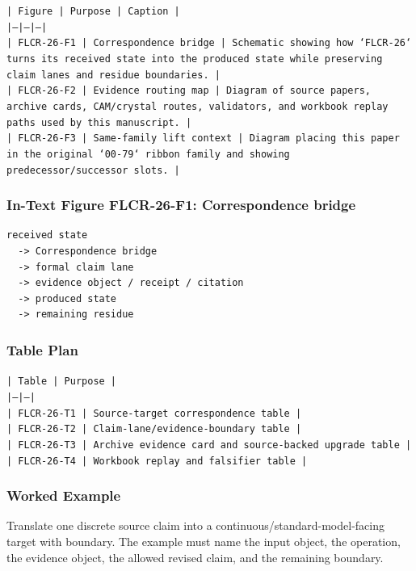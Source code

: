 \documentclass[11pt]{article}
\begin{document}
\noindent\texttt{| Figure | Purpose | Caption |}\\
\noindent\texttt{|---|---|---|}\\
\noindent\texttt{| FLCR-26-F1 | Correspondence bridge | Schematic showing how `FLCR-26` turns its received state into the produced state while preserving claim lanes and residue boundaries. |}\\
\noindent\texttt{| FLCR-26-F2 | Evidence routing map | Diagram of source papers, archive cards, CAM/crystal routes, validators, and workbook replay paths used by this manuscript. |}\\
\noindent\texttt{| FLCR-26-F3 | Same-family lift context | Diagram placing this paper in the original `00-79` ribbon family and showing predecessor/successor slots. |}\\

\subsubsection*{In-Text Figure FLCR-26-F1: Correspondence bridge}

\begin{verbatim}
received state
  -> Correspondence bridge
  -> formal claim lane
  -> evidence object / receipt / citation
  -> produced state
  -> remaining residue
\end{verbatim}

\subsubsection*{Table Plan}

\noindent\texttt{| Table | Purpose |}\\
\noindent\texttt{|---|---|}\\
\noindent\texttt{| FLCR-26-T1 | Source-target correspondence table |}\\
\noindent\texttt{| FLCR-26-T2 | Claim-lane/evidence-boundary table |}\\
\noindent\texttt{| FLCR-26-T3 | Archive evidence card and source-backed upgrade table |}\\
\noindent\texttt{| FLCR-26-T4 | Workbook replay and falsifier table |}\\

\subsubsection*{Worked Example}

Translate one discrete source claim into a continuous/standard-model-facing target with boundary. The example must name the input object, the operation,
the evidence object, the allowed revised claim, and the remaining boundary.
\end{document}
